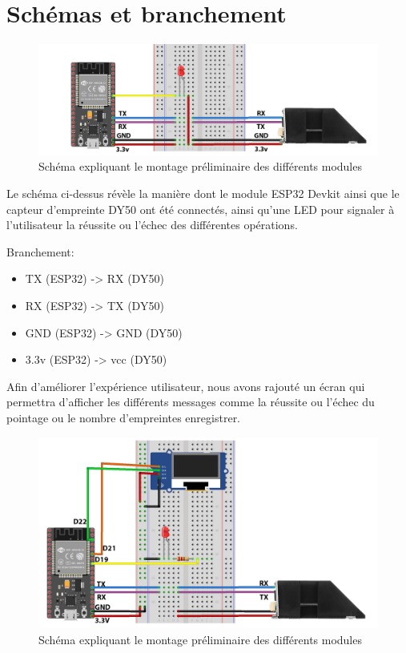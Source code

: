 \section{Schémas et branchement}

 \begin{figure}[h!]
    \centering
    \includegraphics[scale=0.19]{images/schema/montage_illustration.png}
    \caption{Schéma expliquant le montage préliminaire des différents modules  }
    \label{fig52}
\end{figure}

Le schéma ci-dessus révèle la manière dont le module ESP32 Devkit ainsi que le 
capteur d’empreinte DY50 ont été connectés, ainsi qu’une LED pour signaler à 
l’utilisateur la réussite ou l’échec des différentes opérations.

\clearpage  
Branchement: 

\begin{itemize}
    \item [\textbullet]TX (ESP32) -> RX (DY50)
    \item [\textbullet]RX (ESP32) -> TX (DY50)
    \item [\textbullet]GND (ESP32) -> GND (DY50) 
    \item [\textbullet]3.3v (ESP32) -> vcc (DY50)    
\end{itemize}            

Afin d’améliorer l’expérience utilisateur, nous avons rajouté un écran qui 
permettra d’afficher les différents messages comme la réussite ou l’échec 
du pointage ou le nombre d’empreintes enregistrer.

\begin{figure}[h!]
    \centering
    \includegraphics[scale=0.2]{images/schema/schemat v3 sans uvc.png}
    \caption{Schéma expliquant le montage préliminaire des différents modules}
    \label{fig53}
\end{figure}

